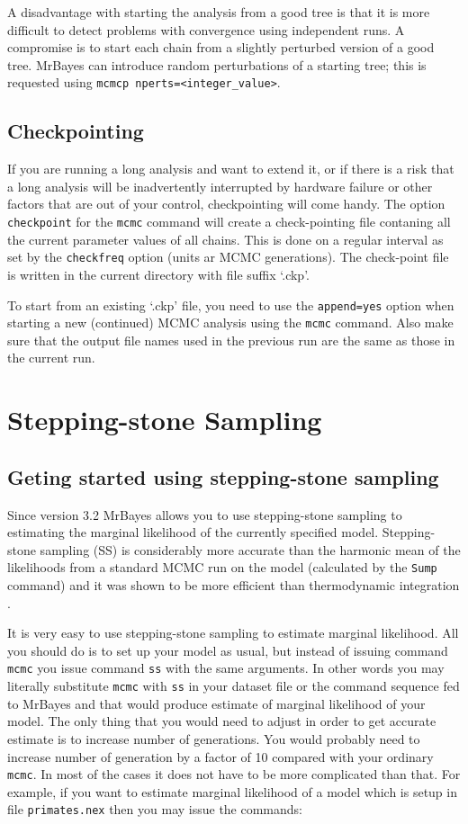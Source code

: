 \documentclass[12pt]{book}
\newcommand{\ttt}[1]{\texttt{#1}}
\begin{document}
A disadvantage with starting the analysis from a good tree is that it is more difficult to detect
problems with convergence using independent runs. A compromise is to start each chain from a
slightly perturbed version of a good tree. MrBayes can introduce random perturbations of a starting
tree; this is requested using \ttt{mcmcp nperts=<integer\_value>}.

\subsection{Checkpointing}
\label{checkpointing}
If you are running a long analysis and want to extend it, or if there is a risk that a long
analysis will be inadvertently interrupted by hardware failure or other factors that are out of
your control, checkpointing will come handy. The option \ttt{checkpoint} for the \ttt{mcmc} command
will create a check-pointing file contaning all the current parameter values of all chains.
This is done on a regular interval as set by the \ttt{checkfreq} option (units ar MCMC generations).
The check-point file is written in the current directory with file suffix `.ckp'.

To start from an existing `.ckp' file, you need to use the \ttt{append=yes} option when starting
a new (continued) MCMC analysis using the \ttt{mcmc} command. Also make sure that the output file
names used in the previous run are the same as those in the current run.

\section{Stepping-stone Sampling}

\subsection{Geting started using stepping-stone sampling}
Since version 3.2 MrBayes allows you to use stepping-stone sampling \citep{xie11} to estimating the
marginal likelihood of the currently specified model. Stepping-stone sampling (SS) is considerably
more accurate than the harmonic mean of the likelihoods from a standard MCMC run on the model
(calculated by the \ttt{Sump} command) and it was shown to be more efficient than thermodynamic
integration \citep{xie11}.

It is very easy to use stepping-stone sampling to estimate marginal likelihood. All you should do
is to set up your model as usual, but instead of issuing command \ttt{mcmc} you issue command
\ttt{ss} with the same arguments. In other words you may literally substitute \ttt{mcmc} with
\ttt{ss} in your dataset file or the command sequence fed to MrBayes and that would produce
estimate of marginal likelihood of your model. The only thing that you would need to adjust in
order to get accurate estimate is to increase number of generations. You would probably need to
increase number of generation by a factor of 10 compared with your ordinary \ttt{mcmc}. In most of
the cases it does not have to be more complicated than that. For example, if you want to estimate
marginal likelihood of a model which is setup in file \ttt{primates.nex} then you may issue the
commands:
\end{document}
